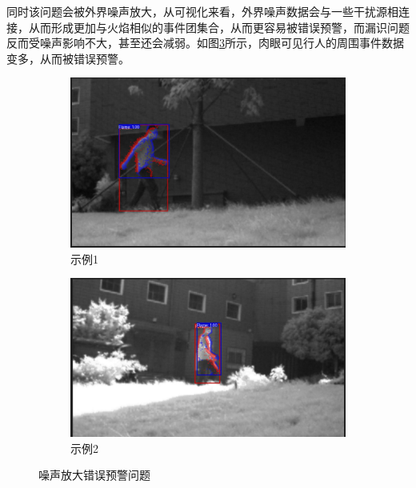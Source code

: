 同时该问题会被外界噪声放大，从可视化来看，外界噪声数据会与一些干扰源相连接，从而形成更加与火焰相似的事件团集合，从而更容易被错误预警，而漏识问题反而受噪声影响不大，甚至还会减弱。如图\ref{23}所示，肉眼可见行人的周围事件数据变多，从而被错误预警。
\begin{figure}[ht]
    \centering
    \begin{subfigure}{0.49\textwidth}
        \centering
        \includegraphics[width=\textwidth]{figures/zaosheng3.png}
        \caption{示例1}
        \label{23.a}
    \end{subfigure}
    \hfill
    \begin{subfigure}{0.49\textwidth}
        \centering
        \includegraphics[width=\textwidth]{figures/zaosheng4.png}
        \caption{示例2}
        \label{23.b}
    \end{subfigure}
    \caption{噪声放大错误预警问题}
    \label{23}
\end{figure}


